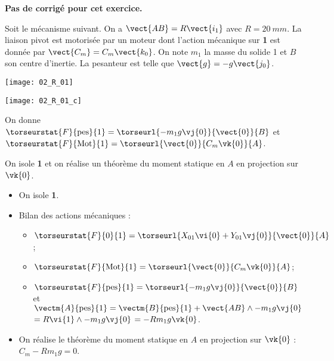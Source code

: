 \normaltrue
\correctiontrue


\setcounter{question}{0}

\ifcorrection
\else
\textbf{Pas de corrigé pour cet exercice.}
\fi

\ifprof
\else
Soit le mécanisme suivant. On a $\vect{AB}=R\vect{i_1}$ avec $R=\SI{20}{mm}$. La liaison pivot est motorisée par un moteur dont l'action mécanique sur \textbf{1} est donnée par $\vect{C_m}=C_m \vect{k_0}$.
On note $m_1$ la masse du solide 1 et $B$ son centre d'inertie. 
 La pesanteur est telle que $\vect{g}=-g\vect{j_0}$.

\begin{center}
\texttt{[image: 02\_R\_01]}
\end{center}
\fi

\ifprof

\begin{center}
\texttt{[image: 02\_R\_01\_c]}
\end{center}
\else
\fi

\ifprof

\else
On donne 
$\torseurstat{F}{\text{pes}}{1}=\torseurl{-m_1g\vj{0}}{\vect{0}}{B}$ et
$\torseurstat{F}{\text{Mot}}{1}=\torseurl{\vect{0}}{C_m\vk{0}}{A}$.

On isole \textbf{1} et on réalise un théorème du moment statique en $A$ en projection sur $\vk{0}$.
\fi

\ifprof

\begin{itemize}
\item On isole \textbf{1}.
\item Bilan des actions mécaniques : 
\begin{itemize}
\item $\torseurstat{F}{0}{1}=\torseurl{X_{01}\vi{0}+Y_{01}\vj{0}}{\vect{0}}{A}$;
\item $\torseurstat{F}{\text{Mot}}{1}=\torseurl{\vect{0}}{C_m\vk{0}}{A}$;
\item $\torseurstat{F}{\text{pes}}{1}=\torseurl{-m_1g\vj{0}}{\vect{0}}{B}$ et 
$\vectm{A}{\text{pes}}{1} = \vectm{B}{\text{pes}}{1} + \vect{AB}\wedge -m_1g\vj{0}$
$=  R\vi{1}\wedge -m_1g\vj{0}$ $=  -Rm_1g\vk{0}$.
\end{itemize}
\item On réalise le théorème du moment statique en $A$ en projection sur $\vk{0}$ :
$C_m  -Rm_1g = 0$.
\end{itemize}
\else
\fi


